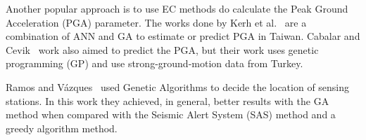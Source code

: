 Another popular approach is to use EC methods do calculate the Peak
Ground Acceleration (PGA) parameter. The works done by Kerh et
al.~\cite{Kerh2010, Kerh2015} are a combination of ANN and GA to
estimate or predict PGA in Taiwan. Cabalar and
Cevik~\cite{Cabalar2009} work also aimed to predict the PGA, but their
work uses genetic programming (GP) and use strong-ground-motion data
from Turkey.

 
Ramos and Vázques~\cite{Ramos2011} used Genetic Algorithms to decide
the location of sensing stations. In this work they achieved, in
general, better results with the GA method when compared with the
Seismic Alert System (SAS) method and a greedy algorithm
method.



